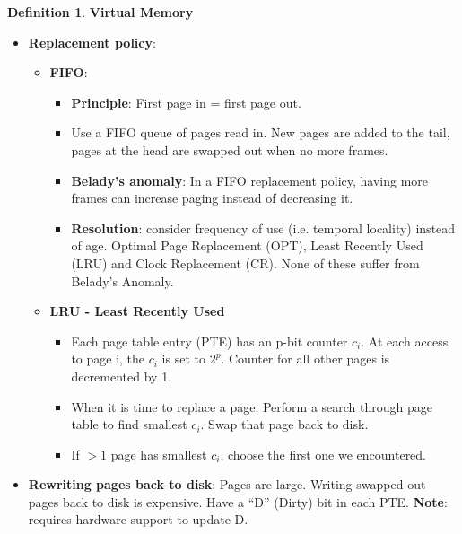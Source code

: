 \documentclass[11pt,a4paper]{article}
\theoremstyle{definition}
\newtheorem{definition}{Definition}[section]
\newenvironment{myitemize}
{ \begin{itemize}
    \setlength{\itemsep}{5pt}
    \setlength{\parskip}{0pt}
    \setlength{\parsep}{0pt}     }
{ \end{itemize}                  }
\begin{document}
\begin{definition}{\textbf{Virtual Memory}}
\begin{myitemize}
\begin{myitemize}
		\item \textbf{Demand Paging}: Page is loaded when an access is made to a location inside it.
		\item \textbf{Pre-paging}: Other pages (e.g. surrounding pages) can be loaded together with the fault page. Pages can be pre-loaded when a process starts.
		\item Can be a mix of strategies.
	\end{myitemize}
	\item \textbf{Replacement policy}:
	\begin{myitemize}
		\item \textbf{FIFO}: 
		\begin{myitemize}
 			\item \textbf{Principle}: First page in = first page out.
		\item Use a FIFO queue of pages read in. New pages are added to the tail, pages at the head are swapped out when no more frames.
		\item \textbf{Belady's anomaly}: In a FIFO replacement policy, having more frames can increase paging instead of decreasing it.
		\item \textbf{Resolution}: consider frequency of use (i.e. temporal locality) instead of age. Optimal Page Replacement (OPT), Least Recently Used (LRU) and Clock Replacement (CR). None of these suffer from Belady's Anomaly.
		\end{myitemize}
		\item \textbf{LRU - Least Recently Used}
		\begin{myitemize}
			\item Each page table entry (PTE) has an p-bit counter $c_i$. At each access to page i, the $c_i$ is set to $2^p$. Counter for all other pages is decremented by 1.
			\item When it is time to replace a page: Perform a search through page table to find smallest $c_i$. Swap that page back to disk.
			\item If $>1$ page has smallest $c_i$, choose the first one we encountered.
		\end{myitemize}
		\end{myitemize}
		\item \textbf{Rewriting pages back to disk}: Pages are large. Writing swapped out pages back to disk is expensive. Have a ``D'' (Dirty) bit in each PTE. \textbf{Note}: requires hardware support to update D.
\end{myitemize}
\end{definition}
\end{document}
